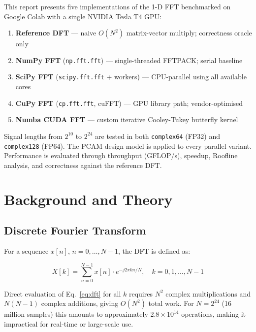 \documentclass[12pt, letterpaper]{article}
\begin{document}
This report presents five implementations of the 1-D FFT benchmarked on Google Colab with a single NVIDIA Tesla T4 GPU:

\begin{enumerate}
    \item \textbf{Reference DFT} --- naive $O(N^2)$ matrix-vector multiply; correctness oracle only
    \item \textbf{NumPy FFT} (\texttt{np.fft.fft}) --- single-threaded FFTPACK; serial baseline
    \item \textbf{SciPy FFT} (\texttt{scipy.fft.fft} + workers) --- CPU-parallel using all available cores
    \item \textbf{CuPy FFT} (\texttt{cp.fft.fft}, cuFFT) --- GPU library path; vendor-optimised
    \item \textbf{Numba CUDA FFT} --- custom iterative Cooley-Tukey butterfly kernel
\end{enumerate}

Signal lengths from $2^{10}$ to $2^{24}$ are tested in both \texttt{complex64} (FP32) and \texttt{complex128} (FP64). The PCAM design model is applied to every parallel variant. Performance is evaluated through throughput (GFLOP/s), speedup, Roofline analysis, and correctness against the reference DFT.

\section{Background and Theory}
\label{sec:theory}

\subsection{Discrete Fourier Transform}

For a sequence $x[n]$, $n = 0, \ldots, N-1$, the DFT is defined as:

\begin{equation}
    X[k] = \sum_{n=0}^{N-1} x[n] \cdot e^{-j2\pi kn/N}, \quad k = 0, 1, \ldots, N-1
    \label{eq:dft}
\end{equation}

Direct evaluation of Eq.~\eqref{eq:dft} for all $k$ requires $N^2$ complex multiplications and $N(N-1)$ complex additions, giving $O(N^2)$ total work. For $N = 2^{24}$ (16 million samples) this amounts to approximately $2.8 \times 10^{14}$ operations, making it impractical for real-time or large-scale use.
\end{document}
